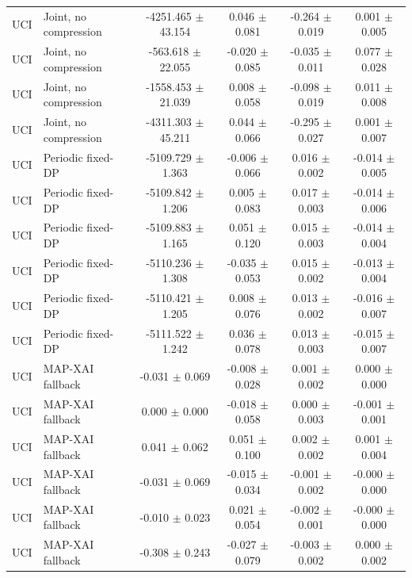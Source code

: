 \begin{table}[t]
\begin{tabular}{llcccc}
UCI & Joint, no compression & -4251.465 $\pm$ 43.154 & 0.046 $\pm$ 0.081 & -0.264 $\pm$ 0.019 & 0.001 $\pm$ 0.005 \\
UCI & Joint, no compression & -563.618 $\pm$ 22.055 & -0.020 $\pm$ 0.085 & -0.035 $\pm$ 0.011 & 0.077 $\pm$ 0.028 \\
UCI & Joint, no compression & -1558.453 $\pm$ 21.039 & 0.008 $\pm$ 0.058 & -0.098 $\pm$ 0.019 & 0.011 $\pm$ 0.008 \\
UCI & Joint, no compression & -4311.303 $\pm$ 45.211 & 0.044 $\pm$ 0.066 & -0.295 $\pm$ 0.027 & 0.001 $\pm$ 0.007 \\
UCI & Periodic fixed-DP & -5109.729 $\pm$ 1.363 & -0.006 $\pm$ 0.066 & 0.016 $\pm$ 0.002 & -0.014 $\pm$ 0.005 \\
UCI & Periodic fixed-DP & -5109.842 $\pm$ 1.206 & 0.005 $\pm$ 0.083 & 0.017 $\pm$ 0.003 & -0.014 $\pm$ 0.006 \\
UCI & Periodic fixed-DP & -5109.883 $\pm$ 1.165 & 0.051 $\pm$ 0.120 & 0.015 $\pm$ 0.003 & -0.014 $\pm$ 0.004 \\
UCI & Periodic fixed-DP & -5110.236 $\pm$ 1.308 & -0.035 $\pm$ 0.053 & 0.015 $\pm$ 0.002 & -0.013 $\pm$ 0.004 \\
UCI & Periodic fixed-DP & -5110.421 $\pm$ 1.205 & 0.008 $\pm$ 0.076 & 0.013 $\pm$ 0.002 & -0.016 $\pm$ 0.007 \\
UCI & Periodic fixed-DP & -5111.522 $\pm$ 1.242 & 0.036 $\pm$ 0.078 & 0.013 $\pm$ 0.003 & -0.015 $\pm$ 0.007 \\
UCI & MAP-XAI fallback & -0.031 $\pm$ 0.069 & -0.008 $\pm$ 0.028 & 0.001 $\pm$ 0.002 & 0.000 $\pm$ 0.000 \\
UCI & MAP-XAI fallback & 0.000 $\pm$ 0.000 & -0.018 $\pm$ 0.058 & 0.000 $\pm$ 0.003 & -0.001 $\pm$ 0.001 \\
UCI & MAP-XAI fallback & 0.041 $\pm$ 0.062 & 0.051 $\pm$ 0.100 & 0.002 $\pm$ 0.002 & 0.001 $\pm$ 0.004 \\
UCI & MAP-XAI fallback & -0.031 $\pm$ 0.069 & -0.015 $\pm$ 0.034 & -0.001 $\pm$ 0.002 & -0.000 $\pm$ 0.000 \\
UCI & MAP-XAI fallback & -0.010 $\pm$ 0.023 & 0.021 $\pm$ 0.054 & -0.002 $\pm$ 0.001 & -0.000 $\pm$ 0.000 \\
UCI & MAP-XAI fallback & -0.308 $\pm$ 0.243 & -0.027 $\pm$ 0.079 & -0.003 $\pm$ 0.002 & 0.000 $\pm$ 0.002 \\
\bottomrule
\end{tabular}
\end{table}
